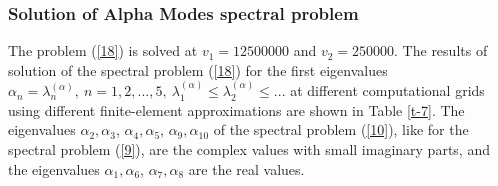 \documentclass[authoryear]{elsarticle}
\begin{document}
\subsubsection{Solution of Alpha Modes spectral problem} 
The problem  (\ref{18}) is solved at $v_1 = 12 500 000$ and $v_2 = 250 000$. The results of solution of the spectral problem (\ref{18}) for the first eigenvalues $\alpha_n = \lambda_n^{(\alpha)}, \ n = 1,2, ..., 5, \  \lambda_1^{(\alpha)} \leq  \lambda_2^{(\alpha )} \leq ...$
at different computational grids using different finite-element approximations are shown in Table \ref{t-7}. 
The eigenvalues $\alpha_2, \alpha_3$, $\alpha_4, \alpha_5$, $\alpha_9, \alpha_{10}$ of the spectral problem (\ref{10}), like for the spectral problem (\ref{9}), are the complex values with small imaginary parts, and the eigenvalues $\alpha_1, \alpha_6$, $\alpha_7, \alpha_8$ are the real values.
\end{document}
